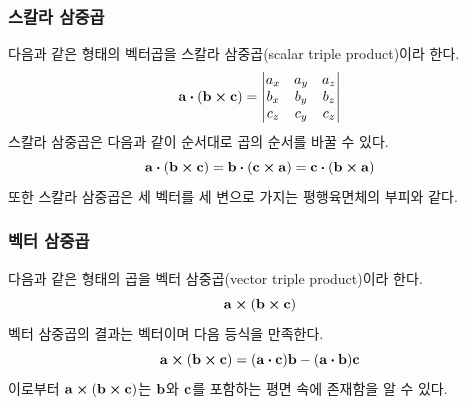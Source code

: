\subsubsection{스칼라 삼중곱}
다음과 같은 형태의 벡터곱을 스칼라 삼중곱(scalar triple product)이라 한다.
\[
  \vb{a} \vdot (\vb{b} \cp \vb{c}) = \begin{vmatrix}
    a_x & a_y & a_z \\
    b_x & b_y & b_z \\
    c_z & c_y & c_z
  \end{vmatrix}
\]
스칼라 삼중곱은 다음과 같이 순서대로 곱의 순서를 바꿀 수 있다.
\[
  \vb{a} \vdot (\vb{b} \cp \vb{c}) = \vb{b} \vdot (\vb{c} \cp \vb{a}) = \vb{c} \vdot (\vb{b} \cp \vb{a})
\]
또한 스칼라 삼중곱은 세 벡터를 세 변으로 가지는 평행육면체의 부피와 같다.

\subsubsection{벡터 삼중곱}
다음과 같은 형태의 곱을 벡터 삼중곱(vector triple product)이라 한다.
\[
  \vb{a} \cp (\vb{b} \cp \vb{c})
\]
벡터 삼중곱의 결과는 벡터이며 다음 등식을 만족한다.
\[
  \vb{a} \cp (\vb{b} \cp \vb{c}) = (\vb{a} \vdot \vb{c}) \vb{b} - (\vb{a} \vdot \vb{b}) \vb{c}
\]
이로부터 $\vb{a} \cp (\vb{b} \cp \vb{c})$는 $\vb{b}$와 $\vb{c}$를 포함하는 평면 속에 존재함을 알 수 있다.